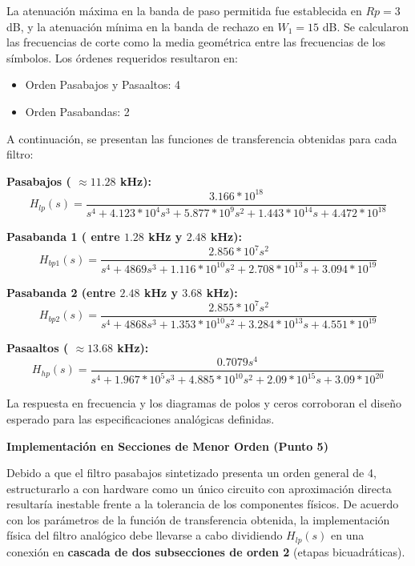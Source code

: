 \documentclass[9pt,a4paper,oneside]{rho-class/rho}
\begin{document}
        La atenuación máxima en la banda de paso permitida fue establecida en $ Rp= 3$ dB, y la atenuación mínima en la banda de rechazo en $W_1 = 15$ dB. Se calcularon las frecuencias de corte como la media geométrica entre las frecuencias de los símbolos. Los órdenes requeridos resultaron en:
        \begin{itemize}
            \item Orden Pasabajos y Pasaaltos: 4
            \item Orden Pasabandas: 2
        \end{itemize}

        A continuación, se presentan las funciones de transferencia obtenidas para cada filtro:

        \textbf{Pasabajos ( $\approx 11.28$ kHz):}
        \begin{equation}
            H_{lp}(s) = \frac{3.166 * 10^{18}}{s^4 + 4.123 * 10^4 s^3 + 5.877 * 10^9 s^2 + 1.443 * 10^{14} s + 4.472 * 10^{18}}
        \end{equation}

        \textbf{Pasabanda 1 ( entre $1.28$ kHz y $2.48$ kHz):}
        \begin{equation}
            H_{bp1}(s) = \frac{2.856 * 10^7 s^2}{s^4 + 4869 s^3 + 1.116 * 10^{10} s^2 + 2.708 * 10^{13} s + 3.094 * 10^{19}}
        \end{equation}

        \textbf{Pasabanda 2 (entre $2.48$ kHz y $3.68$ kHz):}
        \begin{equation}
            H_{bp2}(s) = \frac{2.855 * 10^7 s^2}{s^4 + 4868 s^3 + 1.353 * 10^{10} s^2 + 3.284 * 10^{13} s + 4.551 * 10^{19}}
        \end{equation}

        \textbf{Pasaaltos ( $\approx 13.68$ kHz):}
        \begin{equation}
            H_{hp}(s) = \frac{0.7079 s^4}{s^4 + 1.967 * 10^5 s^3 + 4.885 * 10^{10} s^2 + 2.09 * 10^{15} s + 3.09 * 10^{20}}
        \end{equation}

        La respuesta en frecuencia y los diagramas de polos y ceros corroboran el diseño esperado para las especificaciones analógicas definidas.

        \textbf{Implementación en Secciones de Menor Orden (Punto 5)}
        
        Debido a que el filtro pasabajos sintetizado presenta un orden general de 4, estructurarlo a con hardware como un único circuito con aproximación directa resultaría inestable frente a la tolerancia de los componentes físicos. De acuerdo con los parámetros de la función de transferencia obtenida, la implementación física del filtro analógico debe llevarse a cabo dividiendo $H_{lp}(s)$ en una conexión en \textbf{cascada de dos subsecciones de orden 2} (etapas bicuadráticas). 
        
\end{document}
